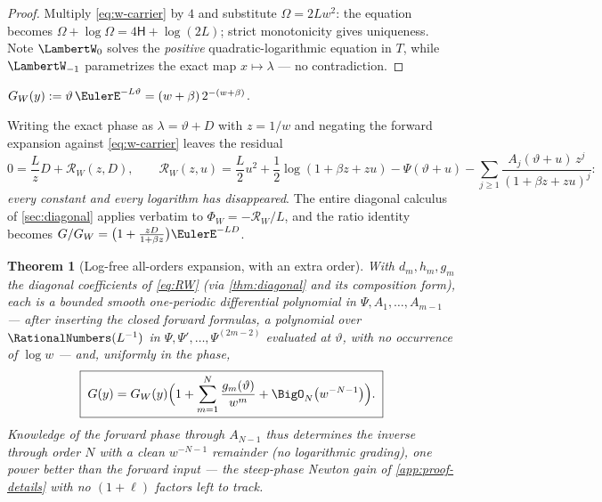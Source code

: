 \documentclass[11pt,oneside]{article}
\numberwithin{equation}{section}
\newtheorem{theorem}{Theorem}[section]
\theoremstyle{definition}
\theoremstyle{remark}
\begin{document}
\begin{proof}
Multiply \eqref{eq:w-carrier} by $4$ and substitute
$\Omega=2Lw^{2}$: the equation becomes
$\Omega+\log\Omega=4\mathsf H+\log(2L)$; strict monotonicity gives
uniqueness.  Note $\LambertW_0$ solves the \emph{positive}
quadratic-logarithmic equation in $T$, while $\LambertW_{-1}$
parametrizes the exact map $x\mapsto\lambda$ --- no contradiction.
\end{proof}

\begin{definition}
$G_W(y):=\vartheta\,\EulerE^{-L\vartheta}
=(w+\beta)\,2^{-(w+\beta)}$.
\end{definition}

Writing the exact phase as $\lambda=\vartheta+D$ with $z=1/w$ and
negating the forward expansion against \eqref{eq:w-carrier} leaves the
residual
\begin{equation}
 0=\frac Lz D+\mathcal R_W(z,D),
 \qquad
 \mathcal R_W(z,u)=
 \frac L2u^{2}+\frac12\log(1+\beta z+zu)
 -\Psi(\vartheta+u)
 -\sum_{j\ge1}\frac{A_j(\vartheta+u)\,z^{j}}{(1+\beta z+zu)^{j}}:
 \label{eq:RW}
\end{equation}
\emph{every constant and every logarithm has disappeared}.  The
entire diagonal calculus of \cref{sec:diagonal} applies verbatim to
$\Phi_W=-\mathcal R_W/L$, and the ratio identity becomes
$G/G_W=\bigl(1+\tfrac{zD}{1+\beta z}\bigr)\EulerE^{-LD}$.

\begin{theorem}[Log-free all-orders expansion, with an extra order]
\label{thm:W-all-orders}
With $d_m,h_m,g_m$ the diagonal coefficients of
\eqref{eq:RW} (via \cref{thm:diagonal} and its composition form),
each is a \emph{bounded} smooth one-periodic differential polynomial
in $\Psi,A_1,\dots,A_{m-1}$ --- after inserting the closed forward
formulas, a polynomial over $\RationalNumbers(L^{-1})$ in
$\Psi,\Psi',\dots,\Psi^{(2m-2)}$ evaluated at $\vartheta$, with no
occurrence of $\log w$ --- and, uniformly in the phase,
\begin{equation}
 \boxed{\;
 G(y)=G_W(y)\Bigl(1+\sum_{m=1}^{N}\frac{g_m(\vartheta)}{w^{m}}
 +\BigO_N\bigl(w^{-N-1}\bigr)\Bigr).
 \;}
 \label{eq:W-expansion}
\end{equation}
Knowledge of the forward phase through $A_{N-1}$ thus determines the
inverse through order $N$ with a \emph{clean} $w^{-N-1}$ remainder
(no logarithmic grading), one power better than the forward input ---
the steep-phase Newton gain of
\cref{app:proof-details} with no $(1+\ell)$ factors left to track.
\end{theorem}
\end{document}
